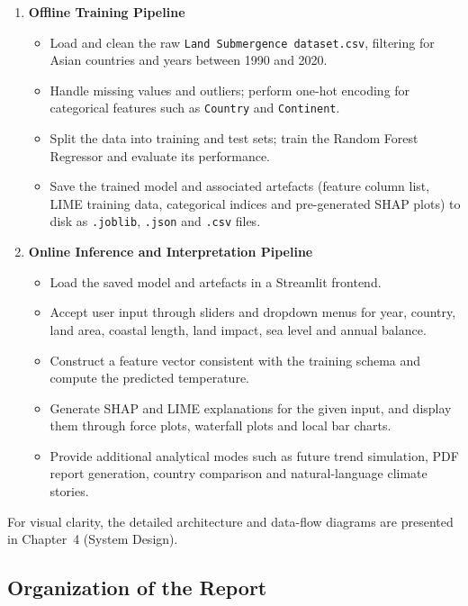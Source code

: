 \documentclass[12pt, a4paper]{article}
\begin{document}
\begin{enumerate}
  \item \textbf{Offline Training Pipeline}
    \begin{itemize}
      \item Load and clean the raw \texttt{Land Submergence dataset.csv},
      filtering for Asian countries and years between 1990 and 2020.
      \item Handle missing values and outliers; perform one-hot encoding
      for categorical features such as \texttt{Country} and \texttt{Continent}.
      \item Split the data into training and test sets; train the Random
      Forest Regressor and evaluate its performance.
      \item Save the trained model and associated artefacts (feature
      column list, LIME training data, categorical indices and
      pre-generated SHAP plots) to disk as \texttt{.joblib}, \texttt{.json}
      and \texttt{.csv} files.
    \end{itemize}
  \item \textbf{Online Inference and Interpretation Pipeline}
    \begin{itemize}
      \item Load the saved model and artefacts in a Streamlit frontend.
      \item Accept user input through sliders and dropdown menus for
      year, country, land area, coastal length, land impact, sea
      level and annual balance.
      \item Construct a feature vector consistent with the training
      schema and compute the predicted temperature.
      \item Generate SHAP and LIME explanations for the given input,
      and display them through force plots, waterfall plots and
      local bar charts.
      \item Provide additional analytical modes such as future trend
      simulation, PDF report generation, country comparison and
      natural-language climate stories.
    \end{itemize}
\end{enumerate}

For visual clarity, the detailed architecture and data-flow diagrams
are presented in Chapter~4 (System Design).

\subsection{\textbf{Organization of the Report}}
\end{document}
